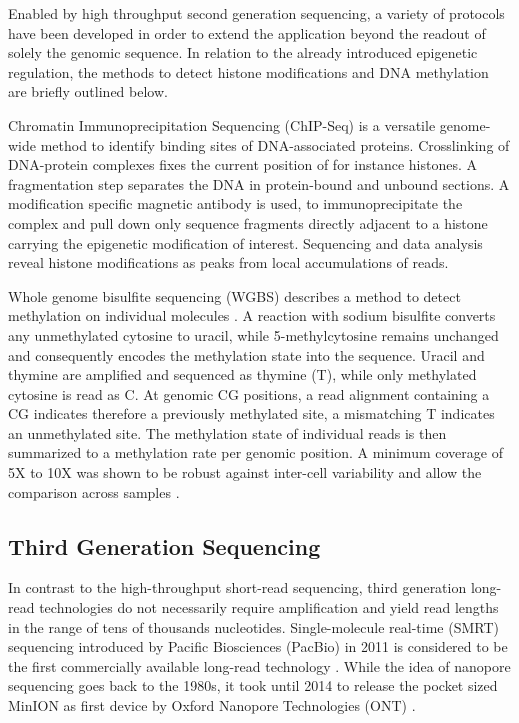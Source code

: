 Enabled by high throughput second generation sequencing, a variety of protocols have been developed in order to extend the application beyond the readout of solely the genomic sequence.
In relation to the already introduced epigenetic regulation, the methods to detect histone modifications and DNA methylation are briefly outlined below.

Chromatin Immunoprecipitation Sequencing (ChIP-Seq) is a versatile genome-wide method to identify binding sites of DNA-associated proteins.
Crosslinking of DNA-protein complexes fixes the current position of for instance histones. 
A fragmentation step separates the DNA in protein-bound and unbound sections.
A modification specific magnetic antibody is used, to immunoprecipitate the complex and pull down only sequence fragments directly adjacent to a histone carrying the epigenetic modification of interest.
Sequencing and data analysis reveal histone modifications as peaks from local accumulations of reads.

Whole genome bisulfite sequencing (WGBS) describes a method to detect methylation on individual molecules \cite{Frommer1992}.
A reaction with sodium bisulfite converts any unmethylated cytosine to uracil, while 5-methylcytosine remains unchanged and consequently encodes the methylation state into the sequence. 
Uracil and thymine are amplified and sequenced as thymine (T), while only methylated cytosine is read as C.
At genomic CG positions, a read alignment containing a CG indicates therefore a previously methylated site, a mismatching T indicates an unmethylated site.
The methylation state of individual reads is then summarized to a methylation rate per genomic position.
A minimum coverage of 5X to 10X was shown to be robust against inter-cell variability and allow the comparison across samples \cite{Ziller2015}.




\subsection{Third Generation Sequencing}
\label{subsec:intro:tgs}

In contrast to the high-throughput short-read sequencing, third generation long-read technologies do not necessarily require amplification and yield read lengths in the range of tens of thousands nucleotides. 
Single-molecule real-time (SMRT) sequencing introduced by Pacific Biosciences (PacBio) in 2011 is considered to be the first commercially available long-read technology \cite{Dijk2018}.
While the idea of nanopore sequencing goes back to the 1980s, it took until 2014 to release the pocket sized MinION as first device by Oxford Nanopore Technologies (ONT) \cite{Deamer2016}.



